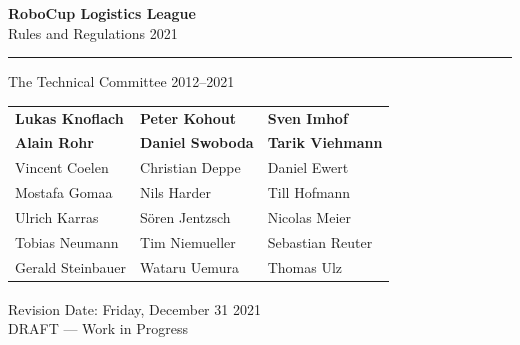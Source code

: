\documentclass[12pt,twoside]{article}
\begin{document}
\hypersetup{pageanchor=false}


\begin{titlepage}
  \vspace*{5cm}
  \begin{center}
    \begin{LARGE}

      {\bf RoboCup Logistics League}\\[2ex]
      {\Large Rules and Regulations 2021}\\[4ex]
    \end{LARGE}
    \hrule

    {\LARGE\vspace*{4ex}}
    \begin{Large}
      The Technical Committee 2012--2021\\[6ex]
    \end{Large}
    \begin{tabular}{lll}
      \textbf{Lukas Knoflach}&
      \textbf{Peter Kohout}&
      \textbf{Sven Imhof}\\
      \textbf{Alain Rohr}&
      \textbf{Daniel Swoboda}&
      \textbf{Tarik Viehmann}\\[.5em]
      Vincent Coelen
      &Christian Deppe
      &Daniel Ewert
      \\
      Mostafa Gomaa
      &Nils Harder
      &Till Hofmann
      \\
      Ulrich Karras
      &S\"oren Jentzsch
      &Nicolas Meier
      \\
      Tobias Neumann
      &Tim Niemueller
      &Sebastian Reuter
      \\
      Gerald Steinbauer
      &Wataru Uemura
      &Thomas Ulz
      \\
    \end{tabular}
    \vfill
    Revision Date: Friday, December 31\textsuperscript{}
    2021
    \\ DRAFT --- Work in Progress
  \end{center}
\end{titlepage}
\thispagestyle{empty}
\pagebreak
\clearpage

\hypersetup{pageanchor=true}
\setcounter{page}{1}
\tableofcontents
\newpage
\cleardoublepage{}

\setcounter{page}{1}
\end{document}
